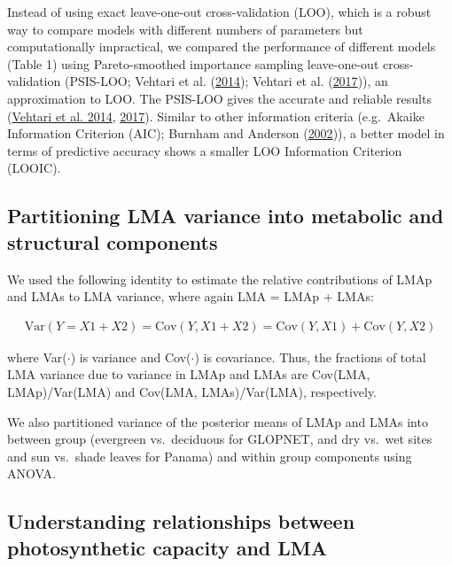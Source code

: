 \documentclass[
  12pt,
  a4paper,
,tablecaptionabove
]{scrartcl}
\begin{document}
Instead of using exact leave-one-out cross-validation (LOO), which is a robust way to compare models with different numbers of parameters but computationally impractical, we compared the performance of different models (Table 1) using Pareto-smoothed importance sampling leave-one-out cross-validation (PSIS-LOO; Vehtari et al. (\protect\hyperlink{ref-Vehtari2014}{2014}); Vehtari et al. (\protect\hyperlink{ref-Vehtari2017}{2017})), an approximation to LOO.
The PSIS-LOO gives the accurate and reliable results (\protect\hyperlink{ref-Vehtari2014}{Vehtari et al. 2014}, \protect\hyperlink{ref-Vehtari2017}{2017}).
Similar to other information criteria (e.g.~Akaike Information Criterion (AIC); Burnham and Anderson (\protect\hyperlink{ref-Burnham2002}{2002})), a better model in terms of predictive accuracy shows a smaller LOO Information Criterion (LOOIC).

\hypertarget{partitioning-lma-variance-into-metabolic-and-structural-components}{%
\subsection{Partitioning LMA variance into metabolic and structural components}\label{partitioning-lma-variance-into-metabolic-and-structural-components}}

We used the following identity to estimate the relative contributions of LMAp and LMAs to LMA variance, where again LMA = LMAp + LMAs:

\begin{align}
\mathrm{Var}(Y = X1 + X2) = \mathrm{Cov}(Y, X1+X2) = \mathrm{Cov}(Y,X1) + \mathrm{Cov}(Y,X2) \tag{7}
\end{align}

where Var(\(\cdot\)) is variance and Cov(\(\cdot\)) is covariance.
Thus, the fractions of total LMA variance due to variance in LMAp and LMAs are Cov(LMA, LMAp)/Var(LMA) and Cov(LMA, LMAs)/Var(LMA), respectively.

We also partitioned variance of the posterior means of LMAp and LMAs into between group (evergreen vs.~deciduous for GLOPNET, and dry vs.~wet sites and sun vs.~shade leaves for Panama) and within group components using ANOVA.

\hypertarget{understanding-relationships-between-photosynthetic-capacity-and-lma}{%
\subsection{Understanding relationships between photosynthetic capacity and LMA}\label{understanding-relationships-between-photosynthetic-capacity-and-lma}}
\end{document}
